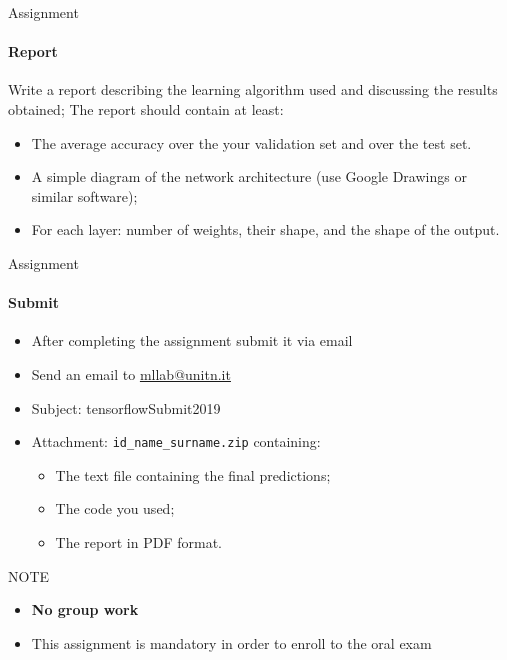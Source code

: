 \documentclass[10pt]{beamer}
\begin{document}
\begin{frame}{Assignment}
\framesubtitle{Report}

 Write a report describing the learning algorithm used and discussing the
results obtained; The report should contain at least:
    \begin{itemize}
    \item The average accuracy over the your validation set and over the test set.
    \item A simple diagram of the network architecture (use Google Drawings or similar software);
	\item For each layer:  number of weights, their shape, and the shape of the output.
    \end{itemize}

\end{frame}

\begin{frame}{Assignment}
\framesubtitle{Submit}

\begin{itemize}
    \item After completing the assignment submit it via email
    \item Send an email to \href{mailto:mllab@unitn.it}{mllab@unitn.it} 
    \item Subject: tensorflowSubmit2019
    \item Attachment: \texttt{id\_name\_surname.zip} containing:
    \begin{itemize}
        \item The text file containing the final predictions;
        \item The code you used;
        \item The report in PDF format.
    \end{itemize}
\end{itemize}
\begin{alertblock}{NOTE}
    \begin{itemize}
	\item \textbf{No group work}
        \item This assignment is mandatory in order to enroll to the oral exam
    \end{itemize}
\end{alertblock}

\end{frame}

\end{document}
